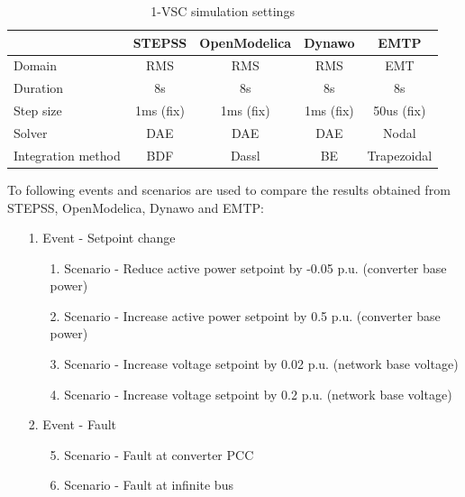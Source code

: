 \documentclass{report}
\begin{document}
\begin{table}[H]
\centering
\caption{1-VSC simulation settings}
\begin{tabular}{lcccc}
\hline
                   & \textbf{STEPSS}                  & \textbf{OpenModelica} & \textbf{Dynawo} & \textbf{EMTP} \\ \hline
Domain             & RMS                              & RMS                   & RMS             & EMT           \\ \hline
Duration           & 8s                               & 8s                    & 8s              & 8s            \\ \hline
Step size          & 1ms (fix)                        & 1ms (fix)             & 1ms (fix)       & 50us (fix)    \\ \hline
Solver             & DAE                              & DAE                   & DAE             & Nodal         \\ \hline
Integration method & BDF & Dassl                 & BE  & Trapezoidal   \\ \hline
\end{tabular}
\label{1VSC_simulation_params}
\end{table}


To following events and scenarios are used to compare the results obtained from STEPSS, OpenModelica, Dynawo and EMTP:
\begin{itemize}
    \item[1.] Event - Setpoint change
    \begin{itemize}
        \item[1.] Scenario - Reduce active power setpoint  by -0.05 p.u. (converter base power)
        \item[2.] Scenario - Increase active power setpoint by 0.5 p.u. (converter base power)
        \item[3.] Scenario - Increase voltage setpoint by 0.02 p.u. (network base voltage)
        \item[4.] Scenario - Increase voltage setpoint by 0.2 p.u. (network base voltage) 
    \end{itemize}
    \item[2.] Event - Fault
    \begin{itemize}
        \item[5.] Scenario - Fault at converter PCC
        \item[6.] Scenario - Fault at infinite bus 
    \end{itemize}
\end{itemize}
\end{document}
